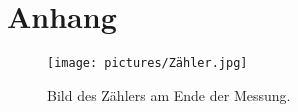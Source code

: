 \section{Anhang} \label{sec:anhang}

\begin{figure}
    \centering
    \texttt{[image: pictures/Zähler.jpg]}
    \caption{Bild des Zählers am Ende der Messung.}
    \label{fig:untergrund}
\end{figure}




